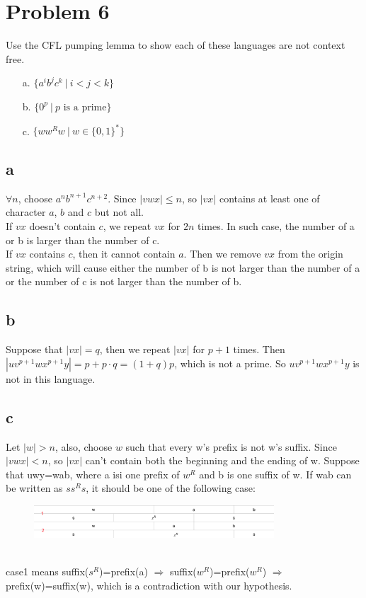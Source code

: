 \documentclass[a4paper,UTF8]{ctexart}
\theoremstyle{definition}
\begin{document}
\section*{Problem 6}
Use the CFL pumping lemma to show each of these languages are not context free.
\begin{enumerate}
	\item[a.] $\{a^ib^jc^k\ |\ i < j < k\}$
	\item[b.] $\{0^p\ |\ p\mbox{ is a prime}\}$
	\item[c.] $\{ww^Rw\ |\ w \in \{0,1\}^* \}$
\end{enumerate}

\subsection*{a}

$\forall n$, choose $a^nb^{n+1}c^{n+2}$. Since $|vwx|\leq n$, so 
$|vx|$ contains at least one of character $a$, $b$ and $c$ but not all.\\
If $vx$ doesn't contain $c$, we repeat $vx$ for $2n$ times. In such case, the number
of a or b is larger than the number of c.\\
If $vx$ contains $c$, then it cannot contain $a$. Then we remove $vx$ from the origin string,
which will cause either the number of b is not larger than the number of a or
the number of c is not larger than the number of b.

\subsection*{b}
Suppose that $|vx|=q$, then we repeat $|vx|$ for $p+1$ times.
Then $|uv^{p+1}wx^{p+1}y|=p+p\cdot q =(1+q)p $, which is not a prime. So $uv^{p+1}wx^{p+1}y$ is not in this language.

\subsection*{c}
Let $|w|>n$, also, choose $w$ such that every w's prefix is not w's suffix. 
Since $|vwx|<n$, so $|vx|$ can't contain both the beginning and the ending of w.
Suppose that uwy=wab, where a isi one prefix of $w^R$ and b is one suffix of w.
If wab can be written as $ss^Rs$, it should be one of the following case:
\begin{figure}[!h]
  \includegraphics[width=0.8\textwidth]{ssr.png}
\end{figure}\\
case1 means suffix($s^R$)=prefix(a) $\Rightarrow$ suffix($w^R$)=prefix($w^R$)
$\Rightarrow$ prefix(w)=suffix(w), which is a contradiction with our hypothesis.
\end{document}
